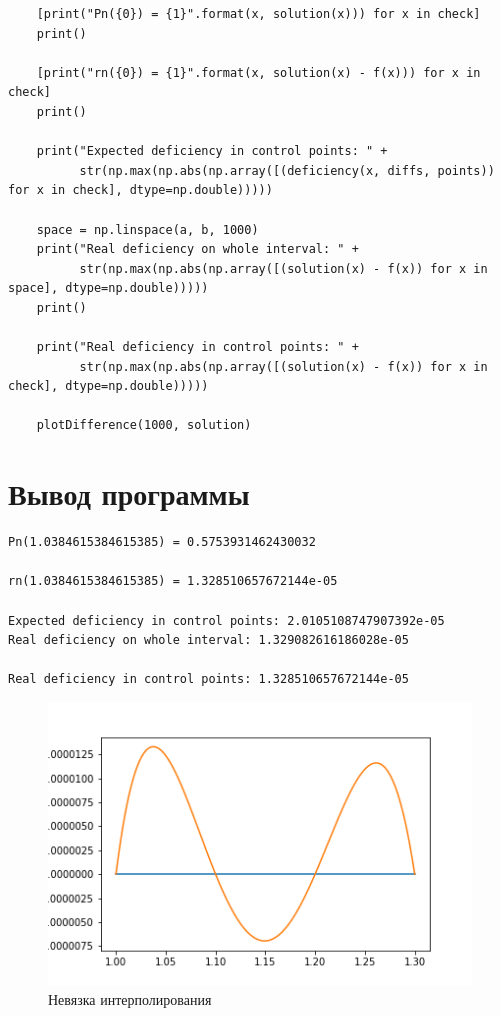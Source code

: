 \documentclass[14pt, a4paper]{article}
\begin{document}
\begin{lstlisting}
    [print("Pn({0}) = {1}".format(x, solution(x))) for x in check]
    print()
    
    [print("rn({0}) = {1}".format(x, solution(x) - f(x))) for x in check]
    print()
    
    print("Expected deficiency in control points: " + 
          str(np.max(np.abs(np.array([(deficiency(x, diffs, points)) for x in check], dtype=np.double)))))
    
    space = np.linspace(a, b, 1000)
    print("Real deficiency on whole interval: " + 
          str(np.max(np.abs(np.array([(solution(x) - f(x)) for x in space], dtype=np.double)))))
    print()
    
    print("Real deficiency in control points: " + 
          str(np.max(np.abs(np.array([(solution(x) - f(x)) for x in check], dtype=np.double)))))
    
    plotDifference(1000, solution)
\end{lstlisting}

  \section{Вывод программы}
\begin{verbatim}
Pn(1.0384615384615385) = 0.5753931462430032

rn(1.0384615384615385) = 1.328510657672144e-05

Expected deficiency in control points: 2.0105108747907392e-05
Real deficiency on whole interval: 1.329082616186028e-05

Real deficiency in control points: 1.328510657672144e-05
\end{verbatim}
\begin{figure}[h!]
  \center
  \includegraphics[width=0.6\linewidth]{EquallySpacedDiff.png}
  \caption{Невязка интерполирования}
\end{figure}
\end{document}
